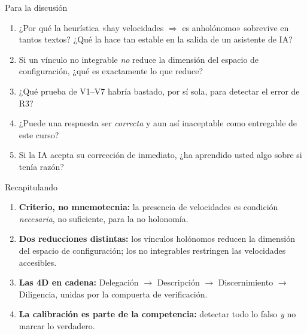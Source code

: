 \documentclass[10pt,aspectratio=169]{beamer}
\begin{document}
\begin{frame}{Para la discusión}
  \begin{enumerate}[<+->]
    \item ¿Por qué la heurística «hay velocidades $\Rightarrow$ es anholónomo» sobrevive en tantos textos? ¿Qué la hace tan estable en la salida de un asistente de IA?
    \item Si un vínculo no integrable \emph{no} reduce la dimensión del espacio de configuración, ¿qué es exactamente lo que reduce?
    \item ¿Qué prueba de V1--V7 habría bastado, por sí sola, para detectar el error de R3?
    \item ¿Puede una respuesta ser \emph{correcta} y aun así inaceptable como entregable de este curso?
    \item Si la IA acepta su corrección de inmediato, ¿ha aprendido usted algo sobre si tenía razón?
  \end{enumerate}
\end{frame}

\begin{frame}{Recapitulando}
  \begin{enumerate}
    \item \textbf{Criterio, no mnemotecnia:} la presencia de velocidades es condición \emph{necesaria}, no suficiente, para la no holonomía.
    \item \textbf{Dos reducciones distintas:} los vínculos holónomos reducen la dimensión del espacio de configuración; los no integrables restringen las velocidades accesibles.
    \item \textbf{Las 4D en cadena:} Delegación $\to$ Descripción $\to$ Discernimiento $\to$ Diligencia, unidas por la compuerta de verificación.
    \item \textbf{La calibración es parte de la competencia:} detectar todo lo falso \emph{y} no marcar lo verdadero.
  \end{enumerate}
\end{frame}

\appendix
\end{document}
